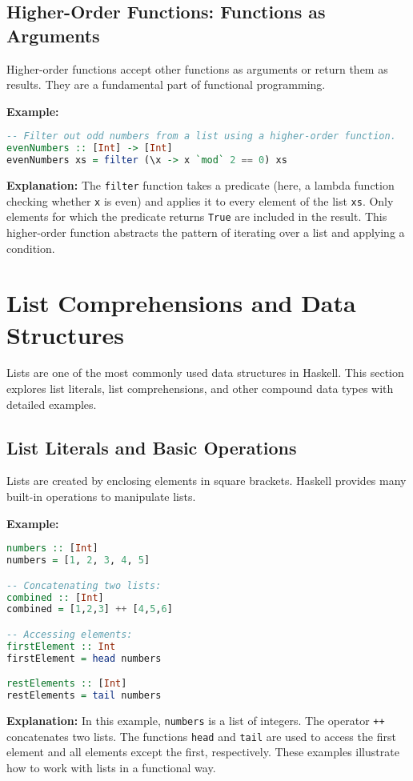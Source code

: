 \documentclass[11pt,a4paper]{article}
\begin{document}
\subsection{Higher-Order Functions: Functions as Arguments}
Higher-order functions accept other functions as arguments or return them as results. They are a fundamental part of functional programming.

\textbf{Example:}
\begin{lstlisting}[language=Haskell]
-- Filter out odd numbers from a list using a higher-order function.
evenNumbers :: [Int] -> [Int]
evenNumbers xs = filter (\x -> x `mod` 2 == 0) xs
\end{lstlisting}

\textbf{Explanation:}  
The \texttt{filter} function takes a predicate (here, a lambda function checking whether \texttt{x} is even) and applies it to every element of the list \texttt{xs}. Only elements for which the predicate returns \texttt{True} are included in the result. This higher-order function abstracts the pattern of iterating over a list and applying a condition.

\section{List Comprehensions and Data Structures}
Lists are one of the most commonly used data structures in Haskell. This section explores list literals, list comprehensions, and other compound data types with detailed examples.

\subsection{List Literals and Basic Operations}
Lists are created by enclosing elements in square brackets. Haskell provides many built-in operations to manipulate lists.

\textbf{Example:}
\begin{lstlisting}[language=Haskell]
numbers :: [Int]
numbers = [1, 2, 3, 4, 5]

-- Concatenating two lists:
combined :: [Int]
combined = [1,2,3] ++ [4,5,6]

-- Accessing elements:
firstElement :: Int
firstElement = head numbers

restElements :: [Int]
restElements = tail numbers
\end{lstlisting}

\textbf{Explanation:}  
In this example, \texttt{numbers} is a list of integers. The operator \texttt{++} concatenates two lists. The functions \texttt{head} and \texttt{tail} are used to access the first element and all elements except the first, respectively. These examples illustrate how to work with lists in a functional way.
\end{document}
